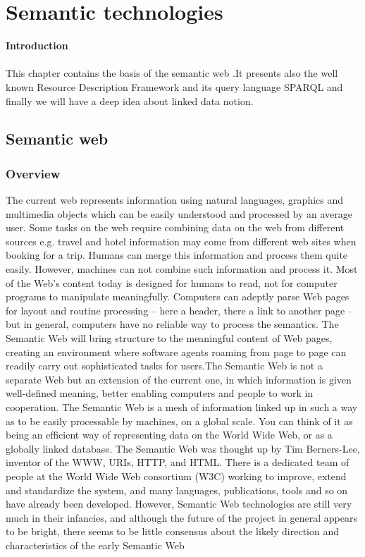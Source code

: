 \documentclass[a4paper,12pt,oneside]{report}
\begin{document}
{\chapter{Semantic technologies}
\textbf{\large Introduction}\\ \\
{This chapter contains the basis of the semantic web .It presents also the well known Resource Description Framework and its query language SPARQL and finally we will have a deep idea about linked data notion.}
\section{Semantic web}
\label{sec:sem}
\subsection{Overview}
{       The current web represents information using natural languages, graphics and multimedia objects which can be easily understood and processed by an average user. Some tasks on the web require combining data on the web from different sources e.g. travel and hotel information may come from different web sites when booking for a trip. Humans can merge this information and process them quite easily. However, machines can not combine such information and process it. Most of the Web’s content today is designed for humans to read, not for computer programs to manipulate meaningfully. Computers can adeptly parse Web pages for layout and routine processing – here a header, there a link to another page – but in general, computers have no reliable way to process the semantics.
The Semantic Web will bring structure to the meaningful content of Web pages, creating an environment where software agents roaming from page to page can readily carry out sophisticated tasks for users.The Semantic Web is not a separate Web but an extension of the current one, in which information is given well-defined meaning, better enabling computers and people to work in cooperation.
The Semantic Web is a mesh of information linked up in such a way as to be easily processable by machines, on a global scale. You can think of it as being an efficient way of representing data on the World Wide Web, or as a globally linked database.
The Semantic Web was thought up by Tim Berners-Lee, inventor of the WWW, URIs, HTTP, and HTML. There is a dedicated team of people at the World Wide Web consortium (W3C) working to improve, extend and standardize the system, and many languages, publications, tools and so on have already been developed. However, Semantic Web technologies are still very much in their infancies, and although the future of the project in general appears to be bright, there seems to be little consensus about the likely direction and characteristics of the early Semantic Web
}}
\end{document}
